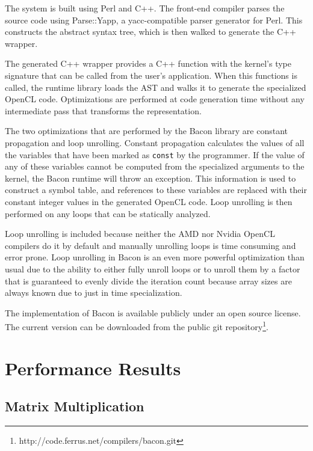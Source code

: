 \documentclass{llncs}
\begin{document}
The system is built using Perl and C++. The front-end compiler parses
the source code using Parse::Yapp\cite{parse::yapp}, a yacc-compatible
parser generator for Perl. This constructs the abstract syntax tree,
which is then walked to generate the C++ wrapper.

The generated C++ wrapper provides a C++ function with the kernel's
type signature that can be called from the user's application. When
this functions is called, the runtime library loads the AST and walks
it to generate the specialized OpenCL code. Optimizations are performed
at code generation time without any intermediate pass that transforms
the representation.

The two optimizations that are performed by the Bacon library are
constant propagation and loop unrolling. Constant propagation
calculates the values of all the variables that have been marked as
{\tt const} by the programmer. If the value of any of these variables
cannot be computed from the specialized arguments to the kernel, the
Bacon runtime will throw an exception.  This information is used to
construct a symbol table, and references to these variables are
replaced with their constant integer values in the generated OpenCL
code. Loop unrolling is then performed on any loops that can be
statically analyzed.

Loop unrolling is included because neither the AMD nor Nvidia OpenCL
compilers do it by default and manually unrolling loops is time
consuming and error prone. Loop unrolling in Bacon is an even more
powerful optimization than usual due to the ability to either fully
unroll loops or to unroll them by a factor that is guaranteed to
evenly divide the iteration count because array sizes are always known
due to just in time specialization.

The implementation of Bacon is available publicly under an open
source license. The current version can be downloaded from the public
git repository\footnote{http://code.ferrus.net/compilers/bacon.git}.

\section{Performance Results}

\subsection{Matrix Multiplication}
\end{document}
